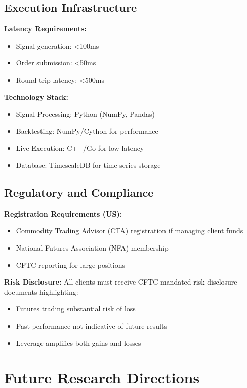 \documentclass[twocolumn,ieee]{arithmaxresearch}
\begin{document}
\subsection{Execution Infrastructure}

\textbf{Latency Requirements:}
\begin{itemize}
    \item Signal generation: <100ms
    \item Order submission: <50ms
    \item Round-trip latency: <500ms
\end{itemize}

\textbf{Technology Stack:}
\begin{itemize}
    \item Signal Processing: Python (NumPy, Pandas)
    \item Backtesting: NumPy/Cython for performance
    \item Live Execution: C++/Go for low-latency
    \item Database: TimescaleDB for time-series storage
\end{itemize}

\subsection{Regulatory and Compliance}

\textbf{Registration Requirements (US):}
\begin{itemize}
    \item Commodity Trading Advisor (CTA) registration if managing client funds
    \item National Futures Association (NFA) membership
    \item CFTC reporting for large positions
\end{itemize}

\textbf{Risk Disclosure:}
All clients must receive CFTC-mandated risk disclosure documents highlighting:
\begin{itemize}
    \item Futures trading substantial risk of loss
    \item Past performance not indicative of future results
    \item Leverage amplifies both gains and losses
\end{itemize}

\section{Future Research Directions}
\end{document}
